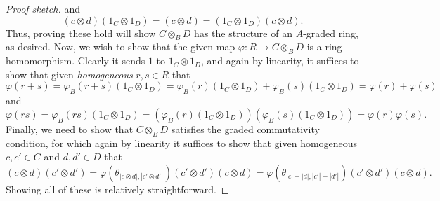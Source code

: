 \documentclass[../main.tex]{subfiles}
\begin{document}
\begin{proof}[Proof sketch]
	and
	\[(c\otimes d)(1_C\otimes 1_D)=(c\otimes d)=(1_C\otimes 1_D)(c\otimes d).\]
	Thus, proving these hold will show $C\otimes_BD$ has the structure of an $A$-graded ring, as desired. Now, we wish to show that the given map $\varphi:R\to C\otimes_BD$ is a ring homomorphism. Clearly it sends $1$ to $1_C\otimes 1_D$, and again by linearity, it suffices to show that given \emph{homogeneous} $r,s\in R$ that
	\[\varphi(r+s)=\varphi_B(r+s)(1_C\otimes 1_D)=\varphi_B(r)(1_C\otimes 1_D)+\varphi_B(s)(1_C\otimes 1_D)=\varphi(r)+\varphi(s)\]
	and
	\[\varphi(rs)=\varphi_B(rs)(1_C\otimes 1_D)=(\varphi_B(r)(1_C\otimes 1_D))(\varphi_B(s)(1_C\otimes 1_D))=\varphi(r)\varphi(s).\]
	Finally, we need to show that $C\otimes_BD$ satisfies the graded commutativity condition, for which again by linearity it suffices to show that given homogeneous $c,c'\in C$ and $d,d'\in D$ that
	\[(c\otimes d)(c'\otimes d')=\varphi(\theta_{|c\otimes d|,|c'\otimes d'|})(c'\otimes d')(c\otimes d)=\varphi(\theta_{|c|+|d|,|c'|+|d'|})(c'\otimes d')(c\otimes d).\]
	Showing all of these is relatively straightforward.
\end{proof}
\end{document}
